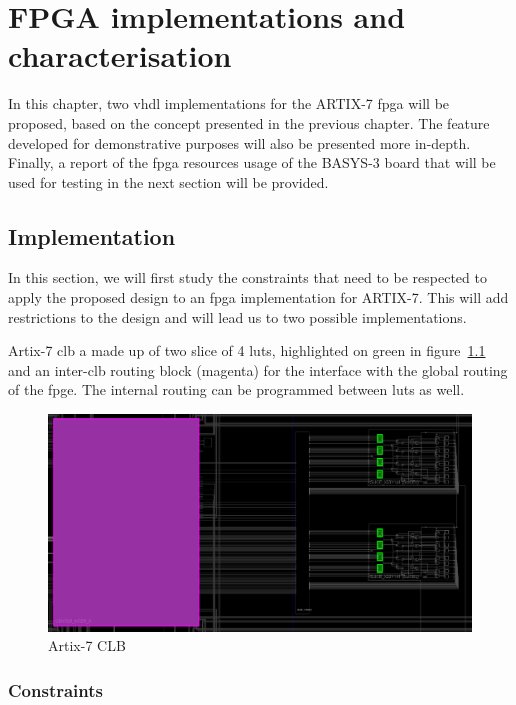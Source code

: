\chapter{FPGA implementations and characterisation}
\label{ch:impl&chara}

In this chapter, two \acrshort{vhdl} implementations for the ARTIX-7 \acrshort{fpga} will be proposed, based on the concept presented in the previous chapter. The feature developed for demonstrative purposes will also be presented more in-depth. Finally, a report of the \acrshort{fpga} resources usage of the BASYS-3 board that will be used for testing in the next section will be provided.\\

\section{Implementation}
\label{sec:impl}

In this section, we will first study the constraints that need to be respected to apply the proposed design to an \acrshort{fpga} implementation for ARTIX-7. This will add restrictions to the design and will lead us to two possible implementations.

Artix-7 \acrfull{clb} a made up of two slice of 4 \acrshort{lut}s, highlighted on green in figure~\ref{fig:clb_routing} and an inter-clb routing block (magenta) for the interface with the global routing of the \acrshort{fpge}. The internal routing can be programmed between \acrshort{lut}s as well.


\begin{figure}[H]
    \centering \includegraphics[width=0.9\linewidth]{images/clb_routing.png}
    \caption{Artix-7 CLB}
    \label{fig:clb_routing}
\end{figure}


\subsection{Constraints}
\label{subsec:impl_constraints}

